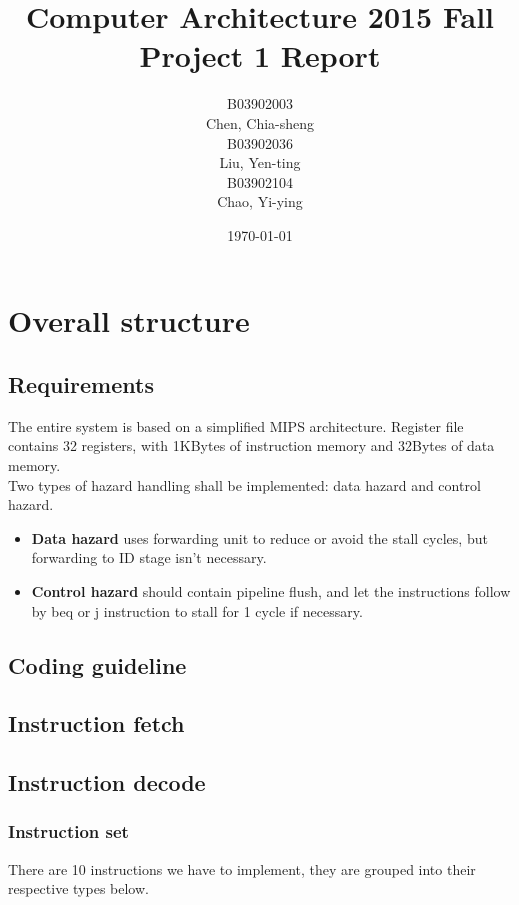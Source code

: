 \documentclass[11pt, a4paper, twoside]{IEEEtran}
\title
{
	Computer Architecture 2015 Fall\\
	Project 1 Report
}
\author
{
	\begin{multicols}{3}
		B03902003\\Chen, Chia-sheng\\
		B03902036\\Liu, Yen-ting\\
		B03902104\\Chao, Yi-ying
	\end{multicols}
}
\date{\today}
\begin{document}
\maketitle

\section{Overall structure}

\subsection{Requirements}
The entire system is based on a simplified MIPS architecture. Register file contains 32 registers, with 1KBytes of instruction memory and 32Bytes of data memory.\\

Two types of hazard handling shall be implemented: data hazard and control hazard.
\begin{itemize}
\item \textbf{Data hazard} uses {\sc forwarding unit} to reduce or avoid the stall cycles, but forwarding to {\sc ID} stage isn't necessary. 
\item \textbf{Control hazard} should contain pipeline flush, and let the instructions follow by beq or j instruction to stall for 1 cycle if necessary.
\end{itemize}


\subsection{Coding guideline}

\subsection{Instruction fetch}

\subsection{Instruction decode}
\subsubsection{Instruction set}
There are 10 instructions we have to implement, they are grouped into their respective types below. 
\end{document}
